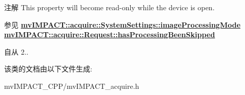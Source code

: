 \begin{DoxyNote}{注解}
This property will become read-\/only while the device is open.
\end{DoxyNote}
\begin{DoxySeeAlso}{参见}
{\bfseries \hyperlink{classmv_i_m_p_a_c_t_1_1acquire_1_1_system_settings_a0e9c91668ae90fb631d5d69c32395fce}{mv\+I\+M\+P\+A\+C\+T\+::acquire\+::\+System\+Settings\+::image\+Processing\+Mode}} ~\newline
{\bfseries \hyperlink{classmv_i_m_p_a_c_t_1_1acquire_1_1_request_a523d15ab27c20de51f0c5ffd41ff3834}{mv\+I\+M\+P\+A\+C\+T\+::acquire\+::\+Request\+::has\+Processing\+Been\+Skipped}} 
\end{DoxySeeAlso}
\begin{DoxySince}{自从}
2.. 
\end{DoxySince}


该类的文档由以下文件生成\+:\begin{DoxyCompactItemize}
\item 
mv\+I\+M\+P\+A\+C\+T\+\_\+\+C\+P\+P/mv\+I\+M\+P\+A\+C\+T\+\_\+acquire.\+h\end{DoxyCompactItemize}
